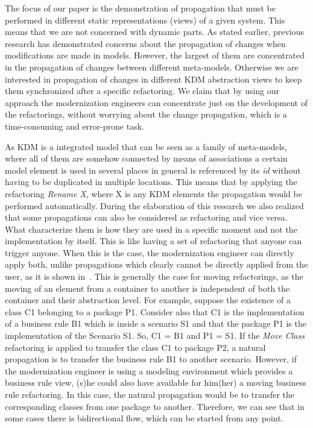 

The focus of our paper is the demonstration of propagation that must be performed in different static representations (views) of a given system. This means that we are not concerned with dynamic parts. As stated earlier, previous research has demonstrated concerns about the propagation of changes when modifications are made in models. However, the largest of them are concentrated in the propagation of changes between different meta-models. Otherwise we are interested in propagation of changes in different KDM abstraction views to keep them synchronized after a specific refactoring.   
%
%
We claim that by using our approach the modernization engineers can concentrate just on the development of the refactorings, without worrying about the change propagation, which is a time-consuming and error-prone task. 

As KDM is a integrated model that can be seen as a family of meta-models, where all of them are somehow connected by means of associations a certain model element is used in several places in general is referenced by its \textit{id} without having to be duplicated in multiple locations. This means that by applying the refactoring \textit{Rename X}, where X is any KDM elements the propagation would be performed automatically. During the elaboration of this research we also realized that some propagations can also be considered as refactoring and vice versa. What characterize them is how they are used in a specific moment and not the implementation by itself. This is like having a set of refactoring that anyone can trigger anyone. When this is the case, the modernization engineer can directly apply both, unlike propagations which clearly cannot be directly applied from the user, as it is shown in~\cite{ICSOFT2014_Winetzhammer}. This is generally the case for moving refactorings, as the moving of an element from a container to another is independent of both the container and their abstraction level. For example, suppose the existence of a class C1 belonging to a package P1. Consider also that C1 is the implementation of a business rule B1 which is inside a scenario S1 and that the package P1 is the implementation of the Scenario S1. So, C1 = B1 and P1 = S1. If the \textit{Move Class} refactoring is applied to transfer the class C1 to package P2, a natural propagation is to transfer the business rule B1 to another scenario. However, if the modernization engineer is using a modeling environment which provides a business rule view, (s)he could also have available for him(her) a moving business rule refactoring. In this case, the natural propagation would be to transfer the corresponding classes from one package to another. Therefore, we can see that in some cases there is bidirectional flow, which can be started from any point.  


